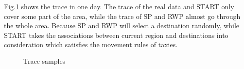 Fig.\ref{figure_tracesample} shows the trace in one day. The trace of the real data and START only cover some part of the area, while the trace of SP and RWP almost go through the whole area. Because SP and RWP will select a destination randomly, while START takes the associations between current region and destinations into consideration which satisfies the movement rules of taxies.
\begin{figure}
\centering
{}
\caption{Trace samples}\label{figure_tracesample}
\end{figure}

